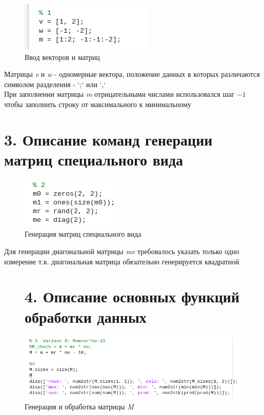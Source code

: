\documentclass[12pt]{article}
\begin{document}
\begin{figure}[!h]
	\centering
	\includegraphics[width=0.4\linewidth]{1_matrix_set.png}
	\caption{Ввод векторов и матриц}
\end{figure}

Матрицы \textit{v} и \textit{w} - одномерные вектора, положение данных в которых различаются символом разделения - `;` или `,` \\

При заполнении матрицы \textit{m} отрицательными числами использовался шаг $-1$ чтобы заполнить строку от максимального к минимальному
 
  \section*{3. Описание команд генерации матриц специального вида}%
  
\begin{figure}[!h]
	\centering
	\includegraphics[width=0.4\linewidth]{2_spec_matrix_set.png}
	\caption{Генерация матриц специального вида}
\end{figure}

Для генерации диагональной матрицы \textit{me} требовалось указать только одно измерение т.к. диагональная матрица обязательно генерируется квадратной

\begin{figure}
  \section*{4. Описание основных функций обработки данных}%
\end{figure}

  
\begin{figure}[!h]
	\centering
	\includegraphics[width=\linewidth]{3_data_manipulating.png}
	\caption{Генерация и обработка матрицы \textit{M}}
\end{figure}
\end{document}
